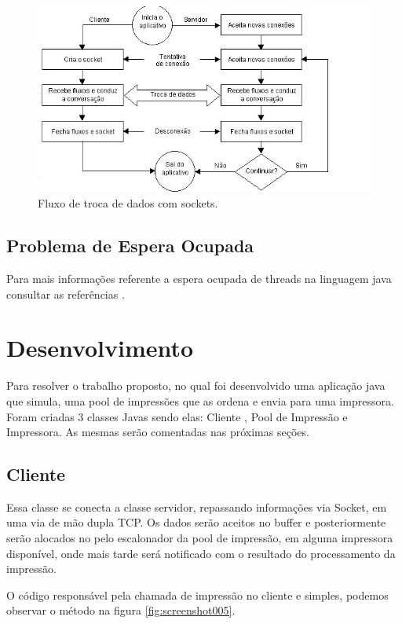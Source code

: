 \documentclass[12pt]{article}
\begin{document}
\begin{figure}[H]
	\centering
	\includegraphics[scale=1]{imagens/fluxoSocket.JPG}
    \caption{Fluxo de troca de dados com sockets.}
	\label{fluxoSocket}
\end{figure}

 \subsection{Problema de Espera Ocupada} \label{Espera}
 	
 Para mais informações referente a espera ocupada de threads na linguagem java consultar as referências \cite{conc} \cite{wait}.
\section{Desenvolvimento}
Para resolver o trabalho proposto, no qual foi desenvolvido uma aplicação java que simula, uma pool de impressões que as ordena e envia para uma impressora.
Foram criadas 3 classes Javas sendo elas: Cliente , Pool de Impressão e Impressora.
As mesmas serão comentadas nas próximas seções.
\subsection{Cliente}
	Essa classe  se conecta a classe servidor, repassando informações via Socket, em uma via de mão dupla TCP.
Os dados serão aceitos no buffer e posteriormente serão alocados no pelo escalonador da pool de impressão, em alguma impressora disponível, onde mais tarde será notificado com o resultado do processamento da impressão.

O código responsável pela chamada de impressão no cliente e simples, podemos observar o método na figura  \ref{fig:screenshot005}.
\end{document}
